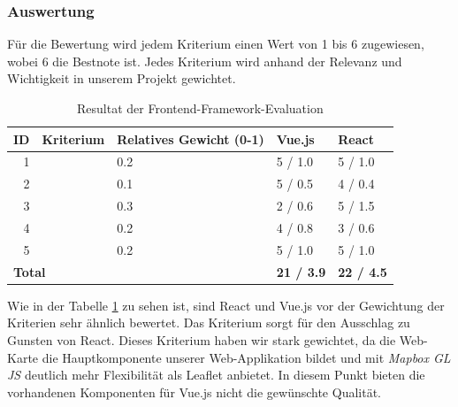 \subsubsection{Auswertung}
\label{Analyse Framework:Auswertung}

Für die Bewertung wird jedem Kriterium einen Wert von 1 bis 6 zugewiesen, wobei 6 die Bestnote ist.
Jedes Kriterium wird anhand der Relevanz und Wichtigkeit in unserem Projekt gewichtet.

\begin{table}[ht]
    \centering
    \begin{tabular}{r l p{3cm} l l}
        \toprule
        \textbf{ID} &
        \textbf{Kriterium} &
        \textbf{Relatives Gewicht (0-1)} &
        \textbf{Vue.js} &
        \textbf{React} \\
        \midrule
        1     & \nameref{Analyse Framework:Funktionsumfang}           & 0.2           & 5 / 1.0   & 5 / 1.0  \\
        2     & \nameref{Analyse Framework:Integration Leaflet}       & 0.1           & 5 / 0.5   & 4 / 0.4  \\
        3     & \nameref{Analyse Framework:Integration Vector Tiles}  & 0.3           & 2 / 0.6   & 5 / 1.5  \\
        4     & \nameref{Analyse Framework:Lernkurve}                 & 0.2           & 4 / 0.8   & 3 / 0.6  \\
        5     & \nameref{Analyse Framework:Tooling}                   & 0.2           & 5 / 1.0   & 5 / 1.0  \\
        \bottomrule
        \multicolumn{3}{l}{\textbf{Total}}                                            & \textbf{21 / 3.9}
                                                                                                & \textbf{22 / 4.5} \\
    \end{tabular}
    \caption{Resultat der Frontend-Framework-Evaluation}
    \label{table:Resultat der Frontend-Framework-Evaluation}
\end{table}

Wie in der Tabelle \ref{table:Resultat der Frontend-Framework-Evaluation} zu sehen ist, sind React und Vue.js vor der Gewichtung der Kriterien sehr ähnlich bewertet.
Das Kriterium  sorgt für den Ausschlag zu Gunsten von React.
Dieses Kriterium haben wir stark gewichtet, da die Web-Karte die Hauptkomponente unserer Web-Applikation bildet und mit \emph{Mapbox GL JS} deutlich mehr Flexibilität als Leaflet anbietet.
In diesem Punkt bieten die vorhandenen Komponenten für Vue.js nicht die gewünschte Qualität.

